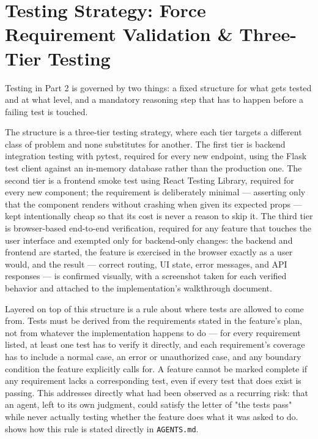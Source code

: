 \section{Testing Strategy: Force Requirement Validation \& Three-Tier Testing}

Testing in Part 2 is governed by two things: a fixed structure for what gets tested and at what level, and a mandatory reasoning step that has to happen before a failing test is touched.

The structure is a three-tier testing strategy, where each tier targets a different class of problem and none substitutes for another. The first tier is backend integration testing with pytest, required for every new endpoint, using the Flask test client against an in-memory database rather than the production one. The second tier is a frontend smoke test using React Testing Library, required for every new component; the requirement is deliberately minimal --- asserting only that the component renders without crashing when given its expected props --- kept intentionally cheap so that its cost is never a reason to skip it. The third tier is browser-based end-to-end verification, required for any feature that touches the user interface and exempted only for backend-only changes: the backend and frontend are started, the feature is exercised in the browser exactly as a user would, and the result --- correct routing, UI state, error messages, and API responses --- is confirmed visually, with a screenshot taken for each verified behavior and attached to the implementation's walkthrough document.

Layered on top of this structure is a rule about where tests are allowed to come from. Tests must be derived from the requirements stated in the feature's plan, not from whatever the implementation happens to do --- for every requirement listed, at least one test has to verify it directly, and each requirement's coverage has to include a normal case, an error or unauthorized case, and any boundary condition the feature explicitly calls for. A feature cannot be marked complete if any requirement lacks a corresponding test, even if every test that does exist is passing. This addresses directly what had been observed as a recurring risk: that an agent, left to its own judgment, could satisfy the letter of "the tests pass" while never actually testing whether the feature does what it was asked to do.  shows how this rule is stated directly in \texttt{AGENTS.md}.

